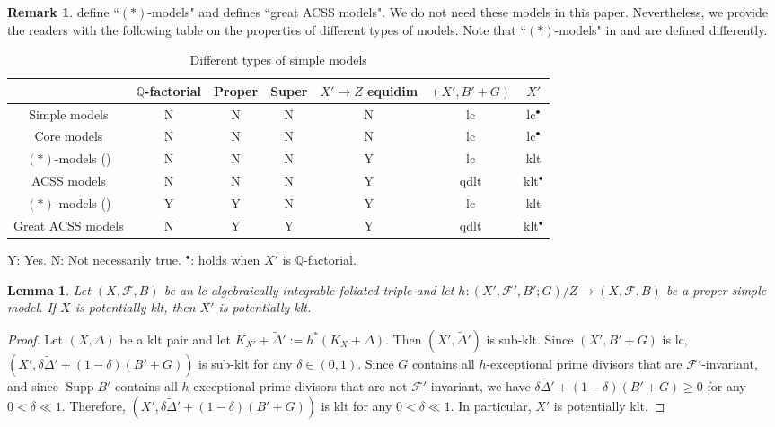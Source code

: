 \documentclass[11pt]{amsart}
\numberwithin{equation}{section}
\newcommand{\Qq}{\mathbb{Q}}
\newcommand{\Supp}{\operatorname{Supp}}
\newcommand{\Ff}{\mathcal{F}}
\newtheorem{lem}[thm]{Lemma}
\theoremstyle{definition}
\theoremstyle{definition}
\newtheorem{rem}[thm]{Remark}
\theoremstyle{definition}
\begin{document}
\begin{rem}
    \cite{ACSS21,CS23a} define ``$(*)$-models" and \cite{CHLX23} defines ``great ACSS models". We do not need these models in this paper. Nevertheless, we provide the readers with the following table on the properties of different types of models. Note that ``$(*)$-models" in \cite{ACSS21} and \cite{CS23a} are defined differently.
\begin{table}[ht]
   \caption{Different types of simple models}
    \label{tab:log structures}
\begin{center}
        \begin{tabular}{|c|c|c|c|c|c|c|}
\hline
& $\Qq$-factorial & Proper & Super & $X'\rightarrow Z$ equidim & $(X',B'+G)$ & $X'$ \\
\hline
Simple models & N &  N & N & N  & lc & lc$^\bullet$\\
\hline
Core models & N & N & N & N & lc & lc$^\bullet$\\
\hline
$(*)$-models (\cite{ACSS21}) & N & N & N & Y & lc & klt \\
\hline
ACSS models & N & N & N & Y & qdlt& klt$^\bullet$\\
\hline
$(*)$-models (\cite{CS23a}) & Y & Y & N & Y & lc & klt \\
\hline
Great ACSS models & N & Y & Y & Y & qdlt & klt$^\bullet$ \\
\hline
\end{tabular}
\end{center}
Y: Yes. N: Not necessarily true. $^\bullet$: holds when $X'$ is $\Qq$-factorial.
\end{table}
\end{rem}


\begin{lem}\label{lem: existence of klt pair on proper simple models}
       Let $(X,\Ff,B)$ be an lc algebraically integrable foliated triple and let $h: (X',\Ff',B';G)/Z\rightarrow (X,\Ff,B)$ be a proper simple model. If $X$ is potentially klt, then $X'$ is potentially klt.
\end{lem}
\begin{proof}
Let $(X,\Delta)$ be a klt pair and let $K_{X'}+\tilde\Delta':=h^*(K_X+\Delta)$. Then $(X',\tilde\Delta')$ is sub-klt. Since $(X',B'+G)$ is lc, $(X',\delta\tilde\Delta'+(1-\delta)(B'+G))$ is sub-klt for any $\delta\in (0,1)$. Since $G$ contains all $h$-exceptional prime divisors that are $\Ff'$-invariant, and since $\Supp B'$ contains all $h$-exceptional prime divisors that are not $\Ff'$-invariant, we have $\delta\tilde\Delta'+(1-\delta)(B'+G)\geq 0$ for any $0<\delta\ll 1$. Therefore, $(X',\delta\tilde\Delta'+(1-\delta)(B'+G))$ is klt for any $0<\delta\ll 1$. In particular, $X'$ is potentially klt.
\end{proof}
\end{document}
